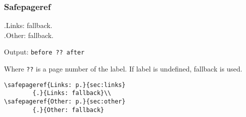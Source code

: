 \documentclass[itdr]{subfiles}
\begin{document}
\subsubsection{Safepageref}

	{.}{Links: fallback.}\\
	{.}{Other: fallback.}

Output: \lstinline!before ?? after!

Where \lstinline!??! is a page number of the label. If label is undefined, fallback is used.

\begin{lstlisting}
\safepageref{Links: p.}{sec:links}
		{.}{Links: fallback}\\
\safepageref{Other: p.}{sec:other}
		{.}{Other: fallback}
\end{lstlisting}

\vfill
\clearpage
\end{document}
